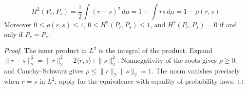 \begin{proposition}
\label{prop:hellinger-affinity}
\[
 H^2(P_r,P_s)=\frac12\int(r-s)^2\,d\mu
 =1-\int rs\,d\mu=1-\rho(r,s).
\]
Moreover $0\le\rho(r,s)\le1$, $0\le H^2(P_r,P_s)\le1$, and
$H^2(P_r,P_s)=0$ if and only if $P_r=P_s$.
\end{proposition}
\begin{proof}
The inner product in $L^2$ is the integral of the product.
Expand $\|r-s\|_2^2=\|r\|_2^2-2\langle r,s\rangle+\|s\|_2^2$.
Nonnegativity of the roots gives $\rho\ge0$, and Cauchy--Schwarz gives
$\rho\le\|r\|_2\|s\|_2=1$. The norm vanishes precisely when
$r=s$ in $L^2$; apply  for the equivalence with
equality of probability laws.
\end{proof}



